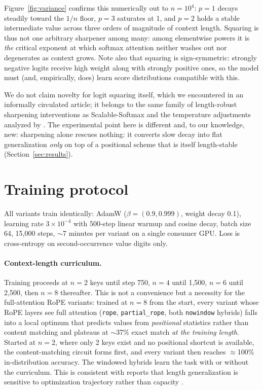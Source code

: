 \documentclass[10pt]{article}
\begin{document}
Figure~\ref{fig:variance} confirms this numerically out to $n=10^4$:
$p=1$ decays steadily toward the $1/n$ floor, $p=3$ saturates at 1, and
$p=2$ holds a stable intermediate value across three orders of magnitude
of context length. Squaring is thus not one arbitrary sharpener among
many: among elementwise powers it is \emph{the} critical exponent at which
softmax attention neither washes out nor degenerates as context grows.
Note also that squaring is sign-symmetric: strongly negative logits receive high weight along with strongly positive ones, so the model
must (and, empirically, does) learn score distributions compatible with
this.

We do not claim novelty for logit squaring itself, which we encountered in
an informally circulated article; it belongs to the same family of
length-robust sharpening interventions as Scalable-Softmax
\citep{nakanishi2025scalable} and the temperature adjustments analyzed by
\citet{velickovic2024softmax}. The experimental point here is different
and, to our knowledge, new: sharpening alone rescues nothing: it converts slow decay into flat generalization \emph{only} on top of a
positional scheme that is itself length-stable
(Section~\ref{sec:results}).

\section{Training protocol}
\label{sec:training}

All variants train identically: AdamW ($\beta=(0.9, 0.999)$, weight decay
0.1), learning rate $3\times10^{-4}$ with 500-step linear warmup and
cosine decay, batch size 64, 15{,}000 steps, $\sim$7 minutes per variant
on a single consumer GPU. Loss is cross-entropy on second-occurrence value
digits only.

\paragraph{Context-length curriculum.} Training proceeds at $n=2$ keys
until step 750, $n=4$ until 1{,}500, $n=6$ until 2{,}500, then $n=8$
thereafter. This is not a convenience but a necessity for the
full-attention RoPE variants: trained at $n=8$ from the start, every
variant whose RoPE layers see full attention (\texttt{rope},
\texttt{partial\_rope}, both \texttt{nowindow} hybrids) falls into a
local optimum that predicts values from \emph{positional} statistics
rather than content matching and plateaus at $\sim$37\% exact match
\emph{at the training length}. Started at $n=2$, where only 2 keys exist and no positional shortcut is available, the content-matching
circuit forms first, and every variant then reaches $\approx$100\%
in-distribution accuracy. The windowed hybrids learn the task with or
without the curriculum. This is consistent with reports that length
generalization is sensitive to optimization trajectory rather than
capacity \citep{zhou2024transformers}.
\end{document}
